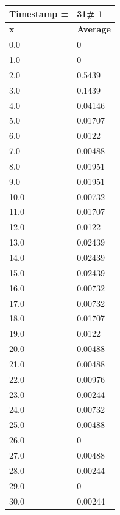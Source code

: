 \begin{tabular}{|l||l|}
\hline
\textbf{Timestamp =} & \textbf{31}\# 1\\\hline
	\textbf{x} & \textbf{Average} \\ \hline
\hline
	0.0 & 0 \\ \hline
	1.0 & 0 \\ \hline
	2.0 & 0.5439 \\ \hline
	3.0 & 0.1439 \\ \hline
	4.0 & 0.04146 \\ \hline
	5.0 & 0.01707 \\ \hline
	6.0 & 0.0122 \\ \hline
	7.0 & 0.00488 \\ \hline
	8.0 & 0.01951 \\ \hline
	9.0 & 0.01951 \\ \hline
	10.0 & 0.00732 \\ \hline
	11.0 & 0.01707 \\ \hline
	12.0 & 0.0122 \\ \hline
	13.0 & 0.02439 \\ \hline
	14.0 & 0.02439 \\ \hline
	15.0 & 0.02439 \\ \hline
	16.0 & 0.00732 \\ \hline
	17.0 & 0.00732 \\ \hline
	18.0 & 0.01707 \\ \hline
	19.0 & 0.0122 \\ \hline
	20.0 & 0.00488 \\ \hline
	21.0 & 0.00488 \\ \hline
	22.0 & 0.00976 \\ \hline
	23.0 & 0.00244 \\ \hline
	24.0 & 0.00732 \\ \hline
	25.0 & 0.00488 \\ \hline
	26.0 & 0 \\ \hline
	27.0 & 0.00488 \\ \hline
	28.0 & 0.00244 \\ \hline
	29.0 & 0 \\ \hline
	30.0 & 0.00244 \\ \hline
\end{tabular}

